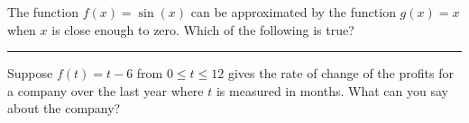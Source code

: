 \documentclass{ximera}
\newcommand{\recommendation}[1]{}
\begin{document}



\begin{problem}
\recommendation{Elizabeth}
  
 The function $f(x)=\sin(x)$ can be approximated by the function $g(x)=x$ when $x$ is close enough to zero.  Which of the following is true?
\begin{multipleChoice}
\end{multipleChoice}
\end{problem}


\hrule



\begin{problem}
  \recommendation{Elizabeth}
  Suppose $f(t) = t-6$ from $0 \leq t \leq 12$ gives the rate of
  change of the profits for a company over the last year where $t$ is
  measured in months.  What can you say about the company?
  \begin{multipleChoice}
  \end{multipleChoice}
\end{problem}
\end{document}
